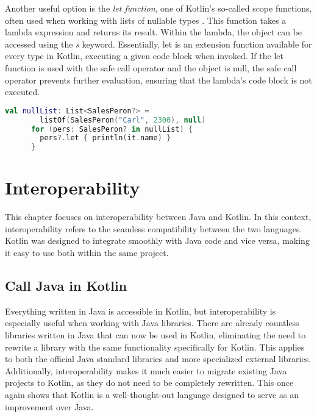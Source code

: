 \documentclass[a4paper, 11pt]{article}
\begin{document}
    Another useful option is the \textit{let function}, one of Kotlin's so-called scope functions, often used when working with lists of nullable types \cite{nullsafety-letfunc}. This function takes a lambda expression and returns its result. Within the lambda, the object can be accessed using the \textit{s} keyword. Essentially, let is an extension function available for every type in Kotlin, executing a given code block when invoked. If the let function is used with the safe call operator and the object is null, the safe call operator prevents further evaluation, ensuring that the lambda's code block is not executed.
    \begin{lstlisting}[language=Kotlin]
      val nullList: List<SalesPeron?> =
        listOf(SalesPeron("Carl", 2300), null)
      for (pers: SalesPeron? in nullList) {
        pers?.let { println(it.name) }
      }
    \end{lstlisting}


\section{Interoperability}
  This chapter focuses on interoperability between Java and Kotlin. In this context, interoperability refers to the seamless compatibility between the two languages. Kotlin was designed to integrate smoothly with Java code and vice versa, making it easy to use both within the same project.

\subsection{Call Java in Kotlin}
  Everything written in Java is accessible in Kotlin, but interoperability is especially useful when working with Java libraries. There are already countless libraries written in Java that can now be used in Kotlin, eliminating the need to rewrite a library with the same functionality specifically for Kotlin. This applies to both the official Java standard libraries and more specialized external libraries. Additionally, interoperability makes it much easier to migrate existing Java projects to Kotlin, as they do not need to be completely rewritten. This once again shows that Kotlin is a well-thought-out language designed to serve as an improvement over Java.
\end{document}
